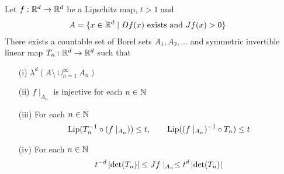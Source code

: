 \begin{lem}\label{CoareaFormulaLipschitz:FunctionBounds}Let $f : \mathbb{R}^d \to \mathbb{R}^d$ be a Lipschitz map, $t>1$ and
\begin{align*}
A &= \lbrace x \in \mathbb{R}^d \mid Df(x) \text{ exists and } Jf(x) > 0\rbrace
\end{align*}
There exists a countable set of Borel sets $A_1, A_2, \dotsc$ and symmetric invertible linear map $T_n : \mathbb{R}^d \to \mathbb{R}^d$ such that 
\begin{itemize}
\item[(i)] $\lambda^d(A \setminus \cup_{n=1}^\infty A_n)$
\item[(ii)] $f \mid_{A_n}$ is injective for each $n \in \mathbb{N}$
\item[(iii)] For each $n \in \mathbb{N}$
\begin{align}\label{eq:CoareaFormulaLipschitz:LipschitzConstants}
\operatorname*{Lip}( T_n^{-1} \circ (f \mid_{A_n})) \leq t, \qquad \operatorname*{Lip}((f
  \mid_{A_n})^{-1} \circ T_n) \leq t
\end{align}
\item[(iv)] For each $n \in \mathbb{N}$
\begin{align}\label{eq:CoareaFormulaLipschitz:JacobianBounds}
t^{-d} \left \vert \det(T_n) \right \vert \leq Jf\mid_{A_n} \leq t^{d} \left \vert \det(T_n) \right \vert 
\end{align}
\end{itemize}
\end{lem}
